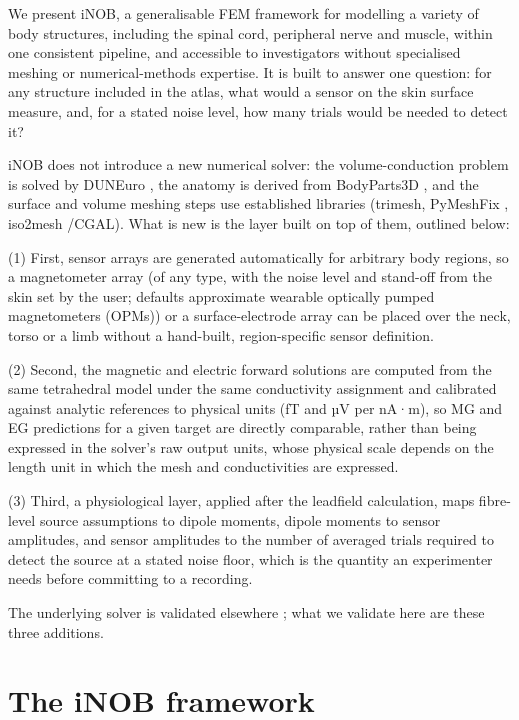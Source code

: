\documentclass[11pt]{article}
\begin{document}
We present iNOB, a generalisable FEM framework for modelling a variety
of body structures, including the spinal cord, peripheral nerve and
muscle, within one consistent pipeline, and accessible to investigators
without specialised meshing or numerical-methods expertise. It is built
to answer one question: for any structure included in the atlas, what would a
sensor on the skin surface measure, and, for a stated noise level, how
many trials would be needed to detect it?

iNOB does not introduce a new numerical solver: the volume-conduction
problem is solved by DUNEuro \citep{242}, the anatomy is derived from
BodyParts3D \citep{241}, and the surface and volume meshing steps use
established libraries (trimesh, PyMeshFix \citep{244}, iso2mesh
\citep{245}/CGAL). What is new is the layer built on top of them,
outlined below:

(1) First, sensor arrays are generated automatically for arbitrary body
regions, so a magnetometer array (of any type, with the noise level and
stand-off from the skin set by the user; defaults approximate wearable
optically pumped magnetometers (OPMs)) or a surface-electrode array can
be placed over the neck, torso or a limb without a hand-built,
region-specific sensor definition.

(2) Second, the magnetic and electric forward solutions are computed
from the same tetrahedral model under the same conductivity assignment
and calibrated against analytic references to physical units (fT and µV
per nA·m), so MG and EG predictions for a given target are directly
comparable, rather than being expressed in the solver's
raw output units, whose physical scale depends on the length unit in
which the mesh and conductivities are expressed.

(3) Third, a physiological layer, applied after the leadfield
calculation, maps fibre-level source assumptions to dipole moments,
dipole moments to sensor amplitudes, and sensor amplitudes to the number
of averaged trials required to detect the source at a stated noise
floor, which is the quantity an experimenter needs before committing to
a recording.

The underlying solver is validated elsewhere \citep{243}; what we
validate here are these three additions.

\section{The iNOB framework}\label{the-inob-framework}
\end{document}
